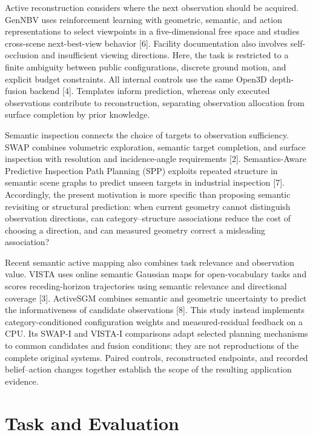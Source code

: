 \documentclass[11pt,a4paper]{article}
\begin{document}
Active reconstruction considers where the next observation should be acquired. GenNBV uses reinforcement learning with geometric, semantic, and action representations to select viewpoints in a five-dimensional free space and studies cross-scene next-best-view behavior {[}6{]}. Facility documentation also involves self-occlusion and insufficient viewing directions. Here, the task is restricted to a finite ambiguity between public configurations, discrete ground motion, and explicit budget constraints. All internal controls use the same Open3D depth-fusion backend {[}4{]}. Templates inform prediction, whereas only executed observations contribute to reconstruction, separating observation allocation from surface completion by prior knowledge.

Semantic inspection connects the choice of targets to observation sufficiency. SWAP combines volumetric exploration, semantic target completion, and surface inspection with resolution and incidence-angle requirements {[}2{]}. Semantics-Aware Predictive Inspection Path Planning (SPP) exploits repeated structure in semantic scene graphs to predict unseen targets in industrial inspection {[}7{]}. Accordingly, the present motivation is more specific than proposing semantic revisiting or structural prediction: when current geometry cannot distinguish observation directions, can category--structure associations reduce the cost of choosing a direction, and can measured geometry correct a misleading association?

Recent semantic active mapping also combines task relevance and observation value. VISTA uses online semantic Gaussian maps for open-vocabulary tasks and scores receding-horizon trajectories using semantic relevance and directional coverage {[}3{]}. ActiveSGM combines semantic and geometric uncertainty to predict the informativeness of candidate observations {[}8{]}. This study instead implements category-conditioned configuration weights and measured-residual feedback on a CPU. Its SWAP-I and VISTA-I comparisons adapt selected planning mechanisms to common candidates and fusion conditions; they are not reproductions of the complete original systems. Paired controls, reconstructed endpoints, and recorded belief--action changes together establish the scope of the resulting application evidence.

\hypertarget{task-and-evaluation}{%
\section{Task and Evaluation}\label{task-and-evaluation}}
\end{document}
